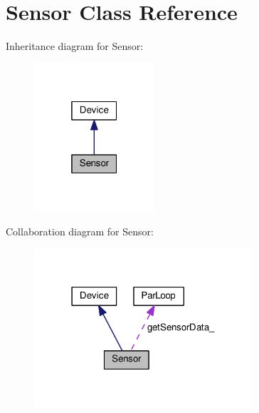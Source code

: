 \hypertarget{class_sensor}{}\section{Sensor Class Reference}
\label{class_sensor}


Inheritance diagram for Sensor\+:\nopagebreak
\begin{figure}[H]
\begin{center}
\leavevmode
\includegraphics[width=127pt]{class_sensor__inherit__graph}
\end{center}
\end{figure}


Collaboration diagram for Sensor\+:\nopagebreak
\begin{figure}[H]
\begin{center}
\leavevmode
\includegraphics[width=231pt]{class_sensor__coll__graph}
\end{center}
\end{figure}
